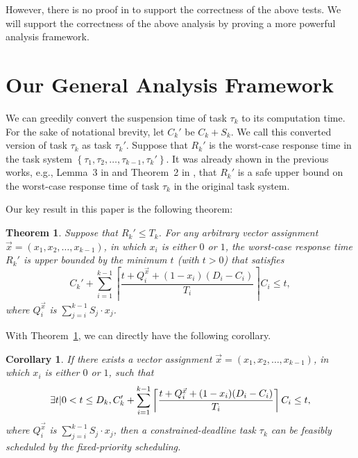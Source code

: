 \documentclass[10pt,conference]{IEEEtran}
\newcommand{\ceiling}[1]{\left\lceil{#1}\right\rceil}
\newcommand{\setof}[1]{\left\{{#1}\right\}}
\newtheorem{theorem}{Theorem}
\newtheorem{Corollary}{Corollary}
\begin{document}
However, there is no proof in \cite{Liu:2000:RS:518501,DBLP:conf/rtss/RajkumarSL88} to support the correctness of the above tests. We will support the correctness of the above analysis by proving a more powerful analysis framework.

\section{Our General Analysis Framework}


We can greedily convert the suspension time of task $\tau_k$ to its
computation time. For the sake of notational brevity, let $C_k'$ be
$C_k + S_k$. We call this converted version of task $\tau_k$ as task
$\tau_k'$.  Suppose that $R_k'$ is the worst-case response time in the
task system $\setof{\tau_1, \tau_2, \ldots, \tau_{k-1}, \tau_k'}$. It
was already shown in the previous works, e.g., Lemma~3 in
\cite{Liu_2014} and Theorem~2 in \cite{ecrts15nelissen}, that $R_k'$
is a safe upper bound on the worst-case response time of task $\tau_k$
in the original task system.

Our key result in this paper is the following theorem:

\begin{theorem}
   \label{theorem:general-framework}
   Suppose that $R_k' \leq T_k$.
   For any arbitrary vector assignment $\vec{x} = (x_1, x_2, \ldots,
   x_{k-1})$, in which $x_i$ is either $0$ or $1$, the worst-case
   response time $R_k'$ is upper bounded by the minimum $t$ (with $t > 0$) that
   satisfies 
   {\small \begin{equation} \label{eq:TDA-suspension-tighter0} 
       C_k'+ \sum_{i=1}^{k-1}\ceiling{\frac{t+Q_i^{\vec{x}}+(1-x_i)(D_i-C_i)}{T_i}} C_i \leq t,
     \end{equation}}where $Q_i^{\vec{x}}$ is $\sum_{j=i}^{k-1} S_j \cdot x_j$.
 \end{theorem}

 With Theorem~\ref{theorem:general-framework}, we can
 directly have the following corollary.

 \begin{Corollary}
   \label{corollary:general-framework}
   If there exists a vector assignment $\vec{x} = (x_1, x_2, \ldots,
   x_{k-1})$, in which $x_i$ is either $0$ or $1$, such that 
   {\small \begin{equation} \label{eq:TDA-suspension-tighter} 
       \exists t | 0 < t \leq D_k, \\
       C_k'+ \sum_{i=1}^{k-1}\ceiling{\frac{t+Q_i^{\vec{x}}+(1-x_i)(D_i-C_i)}{T_i}} C_i \leq t,
     \end{equation}}where $Q_i^{\vec{x}}$ is $\sum_{j=i}^{k-1} S_j \cdot x_j$, then a constrained-deadline task $\tau_k$ can be feasibly scheduled by the fixed-priority scheduling.
 \end{Corollary}
\end{document}
